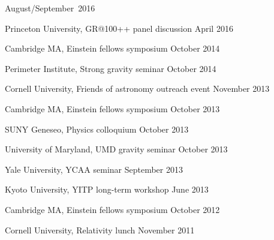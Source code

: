 \begin{etaremune}
  \hfill{}
  August/September~2016
\item
  Princeton University,
  GR@100++ panel discussion
  \hfill{}
  April 2016
\item
  Cambridge MA,
  Einstein fellows symposium
  \hfill{}
  October 2014
\item
  Perimeter Institute,
  Strong gravity seminar
  \hfill{}
  October 2014
\item
  Cornell University,
  Friends of astronomy outreach event
  \hfill{}
  November 2013
\item
  Cambridge MA,
  Einstein fellows symposium
  \hfill{}
  October 2013
\item
  SUNY Geneseo,
  Physics colloquium
  \hfill{}
  October 2013
\item
  University of Maryland,
  UMD gravity seminar
  \hfill{}
  October 2013
\item
  Yale University,
  YCAA seminar
  \hfill{}
  September 2013
\item
  Kyoto University,
  YITP long-term workshop
  \hfill{}
  June 2013
\item
  Cambridge MA,
  Einstein fellows symposium
  \hfill{}
  October 2012
\item
  Cornell University,
  Relativity lunch
  \hfill{}
  November 2011
\end{etaremune}

